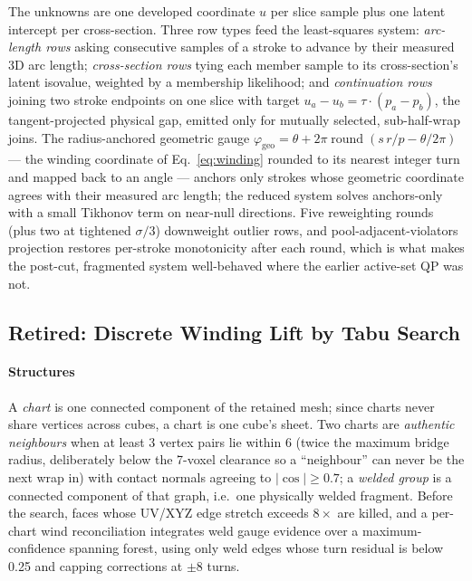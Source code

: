 The unknowns are one developed coordinate $u$ per slice sample plus one latent intercept per cross-section. Three row types feed the least-squares system: {\em arc-length rows} asking consecutive samples of a stroke to advance by their measured 3D arc length; {\em cross-section rows} tying each member sample to its cross-section's latent isovalue, weighted by a membership likelihood; and {\em continuation rows} joining two stroke endpoints on one slice with target $u_a - u_b = \tau \cdot (p_a - p_b)$, the tangent-projected physical gap, emitted only for mutually selected, sub-half-wrap joins. The radius-anchored geometric gauge
$\varphi_{\mathrm{geo}}=\theta+2\pi\operatorname{round}\!\left(s\,r/p-\theta/2\pi\right)$
--- the winding coordinate of Eq.~\eqref{eq:winding} rounded to its nearest integer turn and mapped back to an angle --- anchors only strokes whose geometric coordinate agrees with their measured arc length; the reduced system solves anchors-only with a small Tikhonov term on near-null directions. Five reweighting rounds (plus two at tightened $\sigma/3$) downweight outlier rows, and pool-adjacent-violators projection restores per-stroke monotonicity after each round, which is what makes the post-cut, fragmented system well-behaved where the earlier active-set QP was not.

\subsection{Retired: Discrete Winding Lift by Tabu Search}
\label{app:tabu}

\paragraph{Structures} A {\em chart} is one connected component of the retained mesh; since charts never share vertices across cubes, a chart is one cube's sheet. Two charts are {\em authentic neighbours} when at least 3 vertex pairs lie within 6 (twice the maximum bridge radius, deliberately below the 7-voxel clearance so a ``neighbour'' can never be the next wrap in) with contact normals agreeing to $|\!\cos| \ge 0.7$; a {\em welded group} is a connected component of that graph, i.e.\ one physically welded fragment. Before the search, faces whose UV/XYZ edge stretch exceeds $8\times$ are killed, and a per-chart wind reconciliation integrates weld gauge evidence over a maximum-confidence spanning forest, using only weld edges whose turn residual is below 0.25 and capping corrections at $\pm8$ turns.


